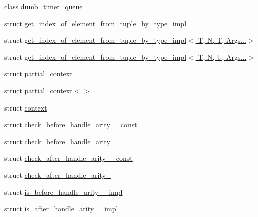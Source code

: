 \begin{DoxyCompactItemize}
\item 
class \hyperlink{classcrow_1_1detail_1_1dumb__timer__queue}{dumb\-\_\-timer\-\_\-queue}
\item 
struct \hyperlink{structcrow_1_1detail_1_1get__index__of__element__from__tuple__by__type__impl}{get\-\_\-index\-\_\-of\-\_\-element\-\_\-from\-\_\-tuple\-\_\-by\-\_\-type\-\_\-impl}
\item 
struct \hyperlink{structcrow_1_1detail_1_1get__index__of__element__from__tuple__by__type__impl_3_01_t_00_01_n_00_01_t_00_01_args_8_8_8_4}{get\-\_\-index\-\_\-of\-\_\-element\-\_\-from\-\_\-tuple\-\_\-by\-\_\-type\-\_\-impl$<$ T, N, T, Args...$>$}
\item 
struct \hyperlink{structcrow_1_1detail_1_1get__index__of__element__from__tuple__by__type__impl_3_01_t_00_01_n_00_01_u_00_01_args_8_8_8_4}{get\-\_\-index\-\_\-of\-\_\-element\-\_\-from\-\_\-tuple\-\_\-by\-\_\-type\-\_\-impl$<$ T, N, U, Args...$>$}
\item 
struct \hyperlink{structcrow_1_1detail_1_1partial__context}{partial\-\_\-context}
\item 
struct \hyperlink{structcrow_1_1detail_1_1partial__context_3_4}{partial\-\_\-context$<$$>$}
\item 
struct \hyperlink{structcrow_1_1detail_1_1context}{context}
\item 
struct \hyperlink{structcrow_1_1detail_1_1check__before__handle__arity__3__const}{check\-\_\-before\-\_\-handle\-\_\-arity\-\_\-\_\-const}
\item 
struct \hyperlink{structcrow_1_1detail_1_1check__before__handle__arity__3}{check\-\_\-before\-\_\-handle\-\_\-arity\-\_}
\item 
struct \hyperlink{structcrow_1_1detail_1_1check__after__handle__arity__3__const}{check\-\_\-after\-\_\-handle\-\_\-arity\-\_\-\_\-const}
\item 
struct \hyperlink{structcrow_1_1detail_1_1check__after__handle__arity__3}{check\-\_\-after\-\_\-handle\-\_\-arity\-\_}
\item 
struct \hyperlink{structcrow_1_1detail_1_1is__before__handle__arity__3__impl}{is\-\_\-before\-\_\-handle\-\_\-arity\-\_\-\_\-impl}
\item 
struct \hyperlink{structcrow_1_1detail_1_1is__after__handle__arity__3__impl}{is\-\_\-after\-\_\-handle\-\_\-arity\-\_\-\_\-impl}
\end{DoxyCompactItemize}
